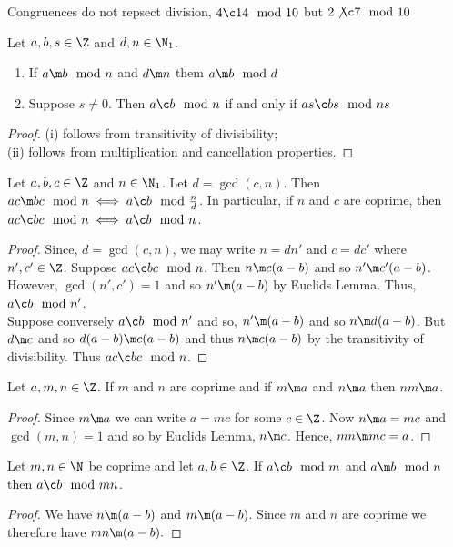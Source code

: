 \begin{remark}
   Congruences do not repsect division, $4 \c 14 \mod 10$ but $2 \not\c 7 \mod 10$
\end{remark}

\begin{nprop}
  Let $a, b, s \in \Z$ and $d, n \in \N_1$.
  \begin{enumerate}
    \item If $a \m b \mod n$ and $d \m n$ them $a \m b \mod d$
    \item Suppose $s \ne 0$. Then $a \c b \mod n$ if and only if $as \c bs \mod ns$
  \end{enumerate}
\end{nprop}
\begin{proof}
  (i) follows from transitivity of divisibility;\\
  (ii) follows from multiplication and cancellation properties.
\end{proof}

\begin{nthm}
  Let $a, b, c \in \Z$ and $n \in \N_1$. Let $d = \gcd (c, n)$. Then $ac \m bc \mod n \iff a \c b \mod \frac{n}{d}$. In particular, if $n$ and $c$ are coprime, then $ac \c bc \mod n \iff a \c b \mod n$.
\end{nthm}
\begin{proof}
  Since, $d = \gcd(c, n)$, we may write $n = dn'$ and $c = dc'$ where $n',c' \in \Z$. Suppose $ac \c bc \mod n$. Then $n \m c(a - b)$ and so $n' \m c'(a - b)$. However, $\gcd(n', c') = 1$ and so $n' \m (a - b)$ by Euclids Lemma. Thus, $a \c b \mod n'$.\\
  Suppose conversely $a \c b \mod n'$ and so, $n' \m (a - b)$ and so $n \m d(a - b)$. But $d \m c$ and so $d(a - b) \m c(a - b)$ and thus $n \m c(a - b)$ by the transitivity of divisibility. Thus $ac \c bc \mod n$.
\end{proof}

\begin{nprop}
  Let $a, m, n \in \Z$. If $m$ and $n$ are coprime and if $m \m a$ and $n \m a$ then $nm \m a$.
\end{nprop}

\begin{proof}
  Since $m \m a$ we can write $a = mc$ for some $c \in \Z$. Now $n \m a = mc$ and $\gcd(m, n) = 1$ and so by Euclids Lemma, $n \m c$. Hence, $mn \m mc = a$.
\end{proof}

\begin{ncor}
  Let $m, n \in \N$ be coprime and let $a, b \in \Z$. If $a \c b \mod m$ and $a \m b \mod n$ then $a \c b \mod mn$.
\end{ncor}
\begin{proof}
  We have $n \m (a - b)$ and $m \m (a - b)$. Since $m$ and $n$ are coprime we therefore have $mn \m (a - b).$
\end{proof}
